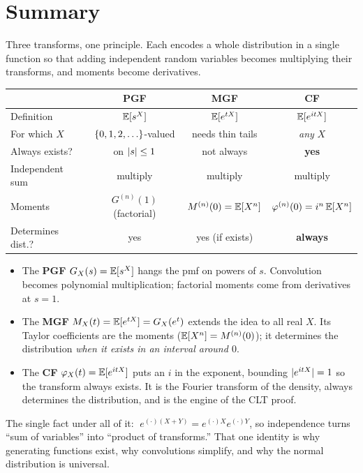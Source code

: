 \section{Summary}
\label{ch18:summary}

Three transforms, one principle. Each encodes a whole distribution in a single
function so that adding independent random variables becomes multiplying their
transforms, and moments become derivatives.

\begin{center}
\begin{tabular}{@{}lccc@{}}
\toprule
 & \textbf{PGF} & \textbf{MGF} & \textbf{CF} \\
\midrule
Definition       & $\operatorname{\mathbb{E}}[s^X]$ & $\operatorname{\mathbb{E}}[e^{tX}]$ & $\operatorname{\mathbb{E}}[e^{itX}]$ \\
For which $X$    & $\set{0,1,2,\dots}$-valued & needs thin tails & \emph{any} $X$ \\
Always exists?   & on $\lvert s\rvert\le1$ & not always & \textbf{yes} \\
Independent sum  & multiply & multiply & multiply \\
Moments          & $G^{(n)}(1)$ (factorial) & $M^{(n)}(0)=\operatorname{\mathbb{E}}[X^n]$
                 & $\varphi^{(n)}(0)=i^n\operatorname{\mathbb{E}}[X^n]$ \\
Determines dist.? & yes & yes (if exists) & \textbf{always} \\
\bottomrule
\end{tabular}
\end{center}

\begin{itemize}
  \item The \textbf{PGF} $G_X(s)=\operatorname{\mathbb{E}}[s^X]$ hangs the pmf on powers of $s$.
        Convolution becomes polynomial multiplication; factorial moments come
        from derivatives at $s=1$.
  \item The \textbf{MGF} $M_X(t)=\operatorname{\mathbb{E}}[e^{tX}]=G_X(e^t)$ extends the idea to all
        real $X$. Its Taylor coefficients are the moments
        ($\operatorname{\mathbb{E}}[X^n]=M^{(n)}(0)$); it determines the distribution \emph{when it
        exists in an interval around $0$}.
  \item The \textbf{CF} $\varphi_X(t)=\operatorname{\mathbb{E}}[e^{itX}]$ puts an $i$ in the exponent,
        bounding $\lvert e^{itX}\rvert=1$ so the transform always exists. It is the
        Fourier transform of the density, always determines the distribution,
        and is the engine of the CLT proof.
\end{itemize}

The single fact under all of it: $\;e^{(\cdot)(X+Y)}=e^{(\cdot)X}e^{(\cdot)Y}$,
so independence turns ``sum of variables'' into ``product of transforms.'' That
one identity is why generating functions exist, why convolutions simplify, and
why the normal distribution is universal.

